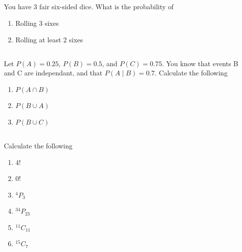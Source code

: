 \documentclass[twocolumn]{article}
\begin{document}
\subsection{}

    You have 3 fair six-sided dice. What is the probability of

    \begin{enumerate}
        \item Rolling 3 sixes
        \item Rolling at least 2 sixes
    \end{enumerate}

\subsection{}

    Let $P(A) = 0.25$, $P(B) = 0.5$, and $P(C) = 0.75$. You know that events B and C are independant, and that $P(A \mid B ) = 0.7 $. Calculate the following

    \begin{enumerate}
        \item $P(A \cap B)$
        \item $P(B \cup A)$
        \item $P(B \cup C)$
    \end{enumerate}

\subsection{}

    Calculate the following

    \begin{multicols}{2}
        \begin{enumerate}
            \item $ 4! $
            \item $ 0! $
            \item $ ^4P_3 $
            \item $ ^{34}P_{23} $
            \item $ ^{11}C_{11} $
            \item $ ^{15}C_{7} $
        \end{enumerate}
    \end{multicols}

\subsection{}
\end{document}
